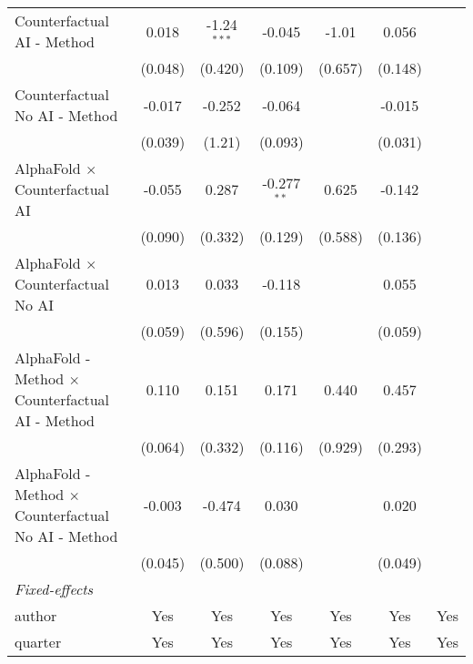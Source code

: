 \begin{tabular}{lcccccc}
   Counterfactual AI - Method                                 & 0.018         & -1.24$^{***}$ & -0.045        & -1.01       & 0.056          &   \\   
                                                              & (0.048)       & (0.420)       & (0.109)       & (0.657)     & (0.148)        &   \\   
   Counterfactual No AI - Method                              & -0.017        & -0.252        & -0.064        &             & -0.015         &   \\   
                                                              & (0.039)       & (1.21)        & (0.093)       &             & (0.031)        &   \\   
   AlphaFold $\times$ Counterfactual AI                       & -0.055        & 0.287         & -0.277$^{**}$ & 0.625       & -0.142         &   \\   
                                                              & (0.090)       & (0.332)       & (0.129)       & (0.588)     & (0.136)        &   \\   
   AlphaFold $\times$ Counterfactual No AI                    & 0.013         & 0.033         & -0.118        &             & 0.055          &   \\   
                                                              & (0.059)       & (0.596)       & (0.155)       &             & (0.059)        &   \\   
   AlphaFold - Method $\times$ Counterfactual AI - Method     & 0.110         & 0.151         & 0.171         & 0.440       & 0.457          &   \\   
                                                              & (0.064)       & (0.332)       & (0.116)       & (0.929)     & (0.293)        &   \\   
   AlphaFold - Method $\times$ Counterfactual No AI - Method  & -0.003        & -0.474        & 0.030         &             & 0.020          &   \\   
                                                              & (0.045)       & (0.500)       & (0.088)       &             & (0.049)        &   \\   
   \midrule
   \emph{Fixed-effects}\\
   author                                                     & Yes           & Yes           & Yes           & Yes         & Yes            & Yes\\  
   quarter                                                    & Yes           & Yes           & Yes           & Yes         & Yes            & Yes\\  

\end{tabular}
